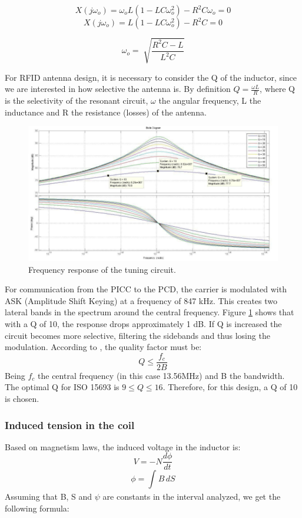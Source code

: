 \documentclass[a4paper, 10pt, conference]{ieeeconf}      %
\begin{document}
$$X(j\omega _o) = \omega _o L(1 - LC\omega _o ^2)-R^2C\omega _o = 0$$
$$X(j\omega _o) = L(1 - LC\omega _o ^2)-R^2C = 0$$

\begin{equation}
\omega _o = \sqrt[]{\frac{R ^2C - L}{L^2C}}
\end{equation}

For RFID antenna design, it is necessary to consider the Q of the inductor, since we are interested in how selective the antenna is. By definition $Q = \frac{\omega L}{R}$, where Q is the selectivity of the resonant circuit, $\omega$  the angular frequency, L the inductance and R the resistance (losses) of the antenna.

\begin{figure}[H]
\centering
\includegraphics[scale=0.25]{Images/ImagenesTesina/antena/Respuesta_Frecuencia.png}
\caption{Frequency response of the tuning circuit.}
\label{fig:transf_frec}
\end{figure}

For communication from the PICC to the PCD, the carrier is modulated with ASK (Amplitude Shift Keying) at a frequency of 847 kHz. This creates two lateral bands in the spectrum around the central frequency. Figure \ref{fig:transf_frec} shows that with a Q of 10, the response drops approximately 1 dB. If Q is increased the circuit becomes more selective, filtering the sidebands and thus losing the modulation. According to  \cite{c8}, the quality factor must be:
\begin{equation}
{Q \leq \frac{f_c}{2B}}
\end{equation}
Being $f_c$ the central frequency (in this case 13.56MHz) and B the bandwidth. The optimal Q for ISO 15693 is $9\leq Q\leq 16$.
Therefore, for this design, a Q of 10 is chosen.

\subsubsection{Induced tension in the coil}
Based on magnetism laws, the induced voltage in the inductor is:
\begin{equation}
V = -N\frac{d\phi}{dt}
\end{equation}
\begin{equation}
\phi = \int_{}^{}  B \, dS
\end{equation}
Assuming that B, S and $\psi$ are constants in the interval analyzed, we get the following formula:
\end{document}
